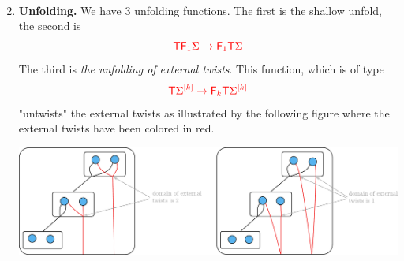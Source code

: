 \begin{enumerate}
$$\item \textbf{Unfolding.} We have 3 unfolding functions. The first is the shallow unfold, the second is 
\begin{align*}
\ranked{\tmonad \reduce 1 \Sigma \to \reduce 1 \tmonad \Sigma }
\end{align*}
The third is \emph{the unfolding of external twists}. This function, which is of type 
\begin{align*}
\ranked{\tmonad \mati k \Sigma \to \reduce k \tmonad \mati k \Sigma}
\end{align*}
"untwists" the external twists  as illustrated by the following figure where the external twists have been colored in red. 
\begin{center}
\includegraphics[scale=.4]{external-unfold.pdf}
\end{center}
\end{enumerate}

